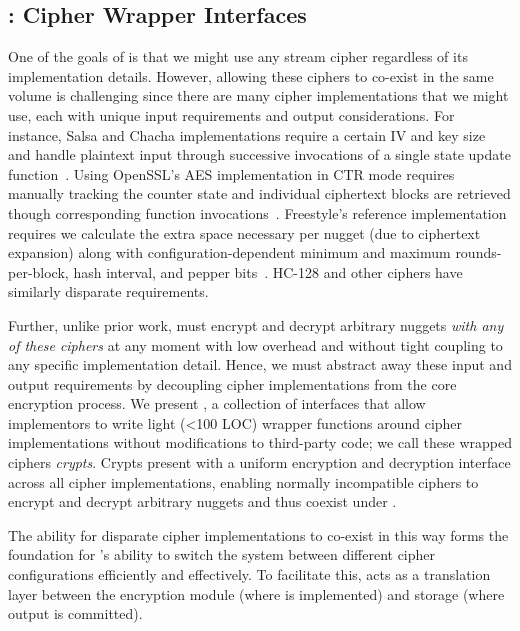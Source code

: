 \subsection{\sysB: Cipher Wrapper Interfaces}\label{subsec:des-crypts}

One of the goals of \sys is that we might use any stream cipher regardless of
its implementation details. However, allowing these ciphers to co-exist in the
same volume is challenging since there are many cipher implementations that we
might use, each with unique input requirements and output considerations. For
instance, Salsa and Chacha implementations require a certain IV and key size and
handle plaintext input through successive invocations of a single state update
function~\cite{Floodyberry}. Using OpenSSL's AES implementation in CTR mode
requires manually tracking the counter state and individual ciphertext blocks
are retrieved though corresponding function invocations~\cite{OpenSSL}.
Freestyle's reference implementation requires we calculate the extra space
necessary per nugget (due to ciphertext expansion) along with
configuration-dependent minimum and maximum rounds-per-block, hash interval, and
pepper bits~\cite{Freestyle}. HC-128 and other ciphers have similarly disparate
requirements.

Further, unlike prior work, \sys must encrypt and decrypt arbitrary nuggets {\em
with any of these ciphers} at any moment with low overhead and without tight
coupling to any specific implementation detail. Hence, we must abstract away
these input and output requirements by decoupling cipher implementations from
the core encryption process. We present \sysB, a collection of interfaces that
allow implementors to write light (<100 LOC) wrapper functions around cipher
implementations without modifications to third-party code; we call these wrapped
ciphers {\em crypts}. Crypts present \sys with a uniform encryption and
decryption interface across all cipher implementations, enabling normally
incompatible ciphers to encrypt and decrypt arbitrary nuggets and thus coexist
under \sys.

The ability for disparate cipher implementations to co-exist in this way forms
the foundation for \sys's ability to switch the system between different cipher
configurations efficiently and effectively. To facilitate this, \sysB acts as a
translation layer between the encryption module (where \sysA is implemented) and
storage (where \sysB output is committed).

